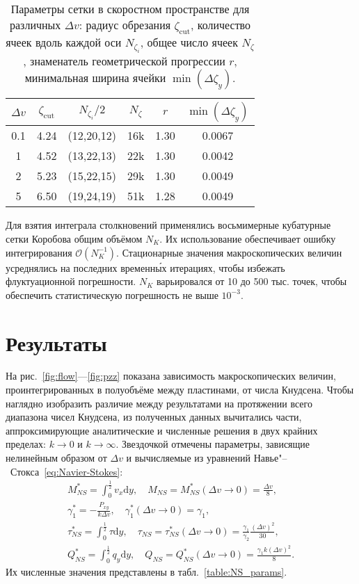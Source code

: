 \documentclass[a4paper,12pt]{article}
\newcommand{\NS}{N\!S}
\newcommand{\dd}{\mathrm{d}}
\begin{document}
\begin{table}
    \centering
    \begin{tabular}{|c|c|c|c|c|c|}
        \hline
        \(\Delta{v}\) & \(\zeta_\mathrm{cut}\) & \(N_{\zeta_i}/2\) & \(N_\zeta\) & \(r\) & \(\min(\Delta\zeta_y)\) \\ \hline
        0.1 & 4.24 & (12,20,12) & 16k & 1.30 & 0.0067 \\ \hline
        1   & 4.52 & (13,22,13) & 22k & 1.30 & 0.0042 \\ \hline
        2   & 5.23 & (15,22,15) & 29k & 1.30 & 0.0049 \\ \hline
        5   & 6.50 & (19,24,19) & 51k & 1.28 & 0.0049 \\ \hline
    \end{tabular}
    \caption{Параметры сетки в скоростном пространстве для различных \(\Delta{v}\):
    	радиус обрезания \(\zeta_\mathrm{cut}\), количество ячеек вдоль каждой оси \(N_{\zeta_i}\),
    	общее число ячеек \(N_\zeta\), знаменатель геометрической прогрессии \(r\),
    	минимальная ширина ячейки \(\min(\Delta\zeta_y)\).}
    \label{table:velocity_mesh}
\end{table}

Для взятия интеграла столкновений применялись восьмимерные кубатурные сетки Коробова
общим объёмом \(N_K\). Их использование обеспечивает ошибку интегрирования \(\mathcal{O}(N_K^{-1})\).
Стационарные значения макроскопических величин усреднялись на последних временн\'{ы}х итерациях,
чтобы избежать флуктуационной погрешности.
\(N_K\) варьировался от 10 до 500 тыс. точек, чтобы обеспечить статистическую погрешность не выше \(10^{-3}\).

\section{Результаты}

На рис.~\ref{fig:flow}---\ref{fig:pzz} показана зависимость макроскопических величин,
проинтегрированных в полуобъёме между пластинами, от числа Кнудсена.
Чтобы наглядно изобразить различие между результатами
на протяжении всего диапазона чисел Кнудсена, из полученных данных вычитались части,
аппроксимирующие аналитические и численные решения в двух крайних пределах: \(k\to0\) и \(k\to\infty\).
Звездочкой отмечены параметры, зависящие нелинейным образом от \(\Delta{v}\) и вычисляемые
из уравнений Навье"--~Стокса~\eqref{eq:Navier-Stokes}:
\begin{gather*}
    M_{\NS}^* = \int_0^\frac12 v_x \dd{y}, \quad M_{\NS} = M_{\NS}^*(\Delta{v}\to0) = \frac{\Delta{v}}8, \\
    \gamma_1^* = -\frac{P_{xy}}{k\Delta{v}}, \quad \gamma_1^*(\Delta{v}\to0) = \gamma_1, \\
    \tau_{\NS}^* = \int_0^\frac12 \tau \dd{y}, \quad
        \tau_{\NS} = \tau_{\NS}^*(\Delta{v}\to0) = \frac{\gamma_1}{\gamma_2}\frac{(\Delta{v})^2}{30}, \\
    Q_{\NS}^* = \int_0^\frac12 q_y \dd{y}, \quad Q_{\NS} = Q_{\NS}^*(\Delta{v}\to0) = \frac{\gamma_1 k (\Delta{v})^2}8.
\end{gather*}
Их численные значения представлены в табл.~\ref{table:NS_params}.
\end{document}
